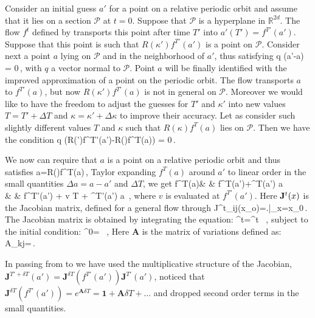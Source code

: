\documentclass[pre,preprint]{revtex4}%
\begin{document}
Consider an initial guess $a'$ for a point on a relative periodic orbit and assume that it lies on
a \Poincare section $\mathcal{P}$ at $t=0$. Suppose that $\mathcal{P}$ is a hyperplane in
$\mathds{R}^{2d}$. The flow $f^t$ defined by  transports 
this point after time $T'$ into $a'(T')=f^{T'}(a')$. Suppose that this point is such that $R(\kappa')f^{T'}(a')$
is a point on $\mathcal{P}$. Consider next a point $a$ lying on $\mathcal{P}$ and in the neighborhood of $a'$,
thus satisfying
\beq
	q \cdot (a'-a) = 0\,,
	\label{eq:cond a}
\eeq
with $q$ a vector normal to $\mathcal{P}$. Point $a$ will be finally identified with the improved 
approximation of a point on the periodic orbit.
The flow transports $a$ to $f^{T'}(a)$, but now $R(\kappa')f^{T'}(a)$ is not in general on $\mathcal{P}$.
Moreover we would like to have the freedom to adjust the guesses for $T'$ and $\kappa'$ into new values
$T=T'+\Delta T$ and $\kappa=\kappa'+\Delta \kappa$ to improve their accuracy. 
Let as consider such slightly different values $T$ and $\kappa$ such that $R(\kappa)f^{T}(a)$ lies on 
$\mathcal{P}$. Then we have the condition
\beq
	q \cdot(R(\kappa')f^{T'}(a')-R(\kappa)f^{T}(a)) = 0\,.
	\label{eq:cond Rf(a)}
\eeq 

 We now can require that $a$ is a point on a relative periodic orbit and thus satisfies 
\beq
	a=R(\kappa)f^{T}(a)\,,
	\label{eq:RPOcond}
\eeq
Taylor expanding $f^{T}(a)$ around $a'$ to linear order in the small quantities 
$\Delta a=a-a'$ and $\Delta T$, we get
\bea
	f^{T}(a)& \simeq & f^{T}(a')+\J^T(a') \Delta a \label{eq:fTaylorl1} \\ 
		& \simeq & f^{T'}(a') + v \Delta T + \J^{T'}(a') \Delta a \label{eq:fTaylorl2} \,, 
\eea
where $v$ is evaluated at $f^{T'}(a')$. Here $\mathbf{J}^t(x)$ is the Jacobian matrix, defined for a general flow through
\beq
   	J^t_{ij}(x_o)=\left.\right|_{x=x_0}\,.
\eeq
The Jacobian matrix is obtained by integrating the equation:
\beq
   	^t=^t \, ,
	\label{eq:Adef}
\eeq
subject to the initial condition:
\beq
   	^0= \, ,
\eeq
Here $\mathbf{A}$ is the matrix of variations defined as:
\beq
	A_{kj}=\,.
\eeq

In passing from  to  we have used the multiplicative 
structure of the Jacobian, $\mathbf{J}^{T'+\delta T}(a')=\mathbf{J}^{\delta T}(f^{T'}(a'))\mathbf{J}^{T'}(a')$, 
noticed that $\mathbf{J}^{\delta T}(f^{T'}(a'))=e^{\mathbf{A}\delta T}=\mathbf{1}+\mathbf{A}\delta T+\ldots$ 
and dropped second order terms in the small quantities.
\end{document}

